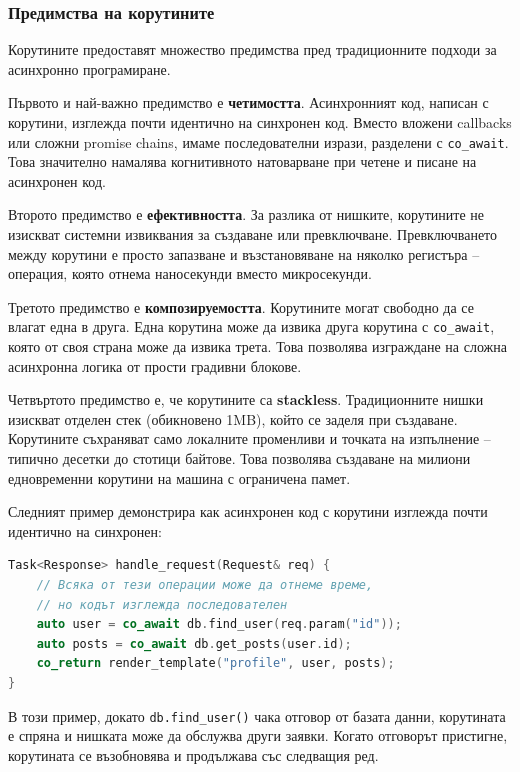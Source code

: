 \subsubsection{Предимства на корутините}

Корутините предоставят множество предимства пред традиционните подходи за асинхронно програмиране.

Първото и най-важно предимство е \textbf{четимостта}. Асинхронният код, написан с корутини, изглежда почти идентично на синхронен код. Вместо вложени callbacks или сложни promise chains, имаме последователни изрази, разделени с \texttt{co\_await}. Това значително намалява когнитивното натоварване при четене и писане на асинхронен код.

Второто предимство е \textbf{ефективността}. За разлика от нишките, корутините не изискват системни извиквания за създаване или превключване. Превключването между корутини е просто запазване и възстановяване на няколко регистъра -- операция, която отнема наносекунди вместо микросекунди.

Третото предимство е \textbf{композируемостта}. Корутините могат свободно да се влагат една в друга. Една корутина може да извика друга корутина с \texttt{co\_await}, която от своя страна може да извика трета. Това позволява изграждане на сложна асинхронна логика от прости градивни блокове.

Четвъртото предимство е, че корутините са \textbf{stackless}. Традиционните нишки изискват отделен стек (обикновено 1MB), който се заделя при създаване. Корутините съхраняват само локалните променливи и точката на изпълнение -- типично десетки до стотици байтове. Това позволява създаване на милиони едновременни корутини на машина с ограничена памет.

Следният пример демонстрира как асинхронен код с корутини изглежда почти идентично на синхронен:

\begin{lstlisting}[language=C++, basicstyle=\small\ttfamily, caption={Пример за асинхронен код с корутини}]
Task<Response> handle_request(Request& req) {
    // Всяка от тези операции може да отнеме време,
    // но кодът изглежда последователен
    auto user = co_await db.find_user(req.param("id"));
    auto posts = co_await db.get_posts(user.id);
    co_return render_template("profile", user, posts);
}
\end{lstlisting}

В този пример, докато \texttt{db.find\_user()} чака отговор от базата данни, корутината е спряна и нишката може да обслужва други заявки. Когато отговорът пристигне, корутината се възобновява и продължава със следващия ред.


